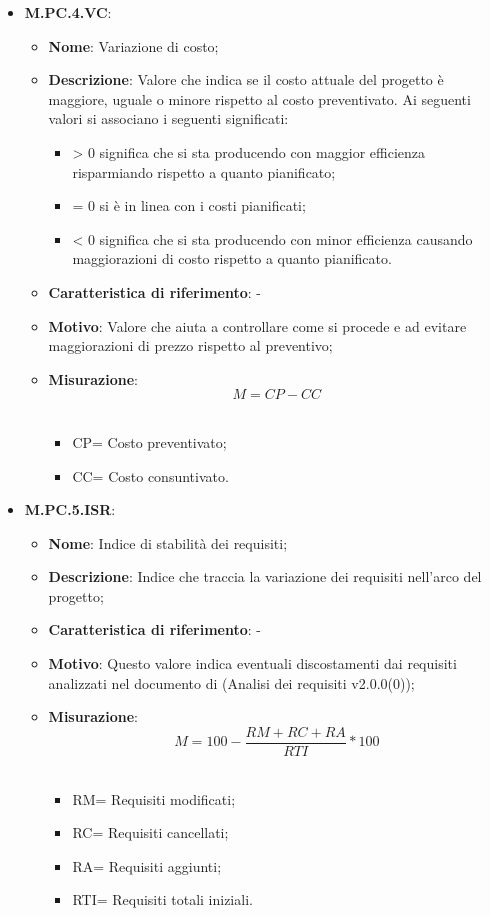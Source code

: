 \documentclass[10pt, a4paper]{article}
\begin{document}
\begin{itemize}
    \item \textbf{M.PC.4.VC}:
    \begin{itemize}
        \item \textbf{Nome}: Variazione di costo;
        \item \textbf{Descrizione}: Valore che indica se il costo attuale del progetto è maggiore, uguale o minore rispetto al costo preventivato. Ai seguenti valori si associano i seguenti significati:
        \begin{itemize}
            \item > 0 significa che si sta producendo con maggior efficienza risparmiando rispetto a quanto pianificato;
            \item = 0 si è in linea con i costi pianificati;
            \item < 0 significa che si sta producendo con minor efficienza causando maggiorazioni di costo rispetto a quanto pianificato.
        \end{itemize}
        \item \textbf{Caratteristica di riferimento}: -
        \item \textbf{Motivo}: Valore che aiuta a controllare come si procede e ad evitare maggiorazioni di prezzo rispetto al preventivo; 
        \item \textbf{Misurazione}:  \[ M=CP-CC \] \\
        \begin{itemize}
        \item CP= Costo preventivato;
        \item CC= Costo consuntivato.\\
        \end{itemize}
    \end{itemize}

    \item \textbf{M.PC.5.ISR}:
    \begin{itemize}
        \item \textbf{Nome}: Indice di stabilità dei requisiti;
        \item \textbf{Descrizione}: Indice che traccia la variazione dei requisiti nell’arco del progetto;
        \item \textbf{Caratteristica di riferimento}: -
        \item \textbf{Motivo}: Questo valore indica eventuali discostamenti dai requisiti analizzati nel documento di (Analisi dei requisiti v2.0.0(0)); 
        \item \textbf{Misurazione}: \[ M=100- \frac{RM + RC + RA}{RTI} *100 \] \\
        \begin{itemize}
        \item RM= Requisiti modificati;
        \item RC= Requisiti cancellati;
        \item RA= Requisiti aggiunti;
        \item RTI= Requisiti totali iniziali.\\
        \end{itemize}
    \end{itemize}


\end{itemize}
\end{document}
